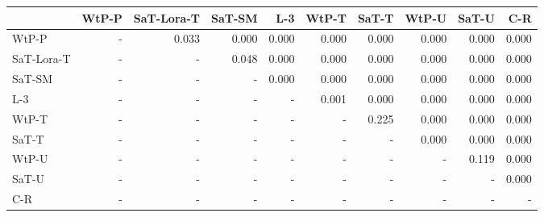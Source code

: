 \begin{tabular}{lrrrrrrrrr}
\toprule
 & WtP-P & SaT-Lora-T & SaT-SM & L-3 & WtP-T & SaT-T & WtP-U & SaT-U & C-R \\
\midrule
WtP-P & - & 0.033 & 0.000 & 0.000 & 0.000 & 0.000 & 0.000 & 0.000 & 0.000 \\
SaT-Lora-T & - & - & 0.048 & 0.000 & 0.000 & 0.000 & 0.000 & 0.000 & 0.000 \\
SaT-SM & - & - & - & 0.000 & 0.000 & 0.000 & 0.000 & 0.000 & 0.000 \\
L-3 & - & - & - & - & 0.001 & 0.000 & 0.000 & 0.000 & 0.000 \\
WtP-T & - & - & - & - & - & 0.225 & 0.000 & 0.000 & 0.000 \\
SaT-T & - & - & - & - & - & - & 0.000 & 0.000 & 0.000 \\
WtP-U & - & - & - & - & - & - & - & 0.119 & 0.000 \\
SaT-U & - & - & - & - & - & - & - & - & 0.000 \\
C-R & - & - & - & - & - & - & - & - & - \\
\bottomrule
\end{tabular}

